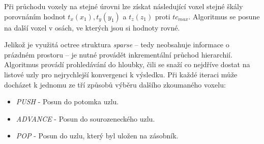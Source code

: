 Při průchodu voxely na stejné úrovni lze získat následující voxel stejné škály porovnáním hodnot $t_x(x_1), t_y(y_1)$ a $t_z(z_1)$ proti $tc_{max}$. Algoritmus se posune na další voxel v osách, ve kterých jsou si hodnoty rovné.

Jelikož je využitá octree struktura \textit{sparse} -- tedy neobsahuje informace o prázdném prostoru -- je nutné provádět inkrementální průchod hierarchií. Algoritmus provádí prohledávání do hloubky, čili se snaží co nejdříve dostat na listové uzly pro nejrychlejší konvergenci k výsledku. Při každé iteraci může docházet k jednomu ze tří způsobů výběru dalšího zkoumaného voxelu:

\begin{itemize}
    \item \textit{PUSH} - Posun do potomka uzlu.
    \item \textit{ADVANCE} - Posun do sourozeneckého uzlu.
    \item \textit{POP} - Posun do uzlu, který byl uložen na zásobník.
\end{itemize}

